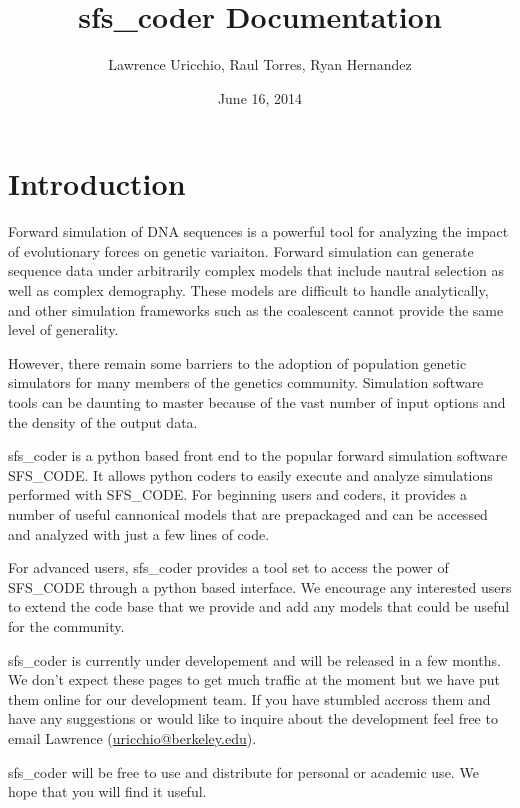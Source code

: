 \documentclass[letterpaper,10pt,english]{sphinxmanual}
\title{sfs\_coder Documentation}
\date{June 16, 2014}
\author{Lawrence Uricchio, Raul Torres, Ryan Hernandez}
\begin{document}
\maketitle
\tableofcontents
{}\label{index::doc}



\chapter{Introduction}
\label{rstfiles/intro:introduction}\label{rstfiles/intro::doc}\label{rstfiles/intro:sfs-coder-documentation}
Forward simulation of DNA sequences is a powerful tool for analyzing the impact
of evolutionary forces on genetic variaiton.  Forward simulation can generate
sequence data under arbitrarily complex models that include nautral selection
as well as complex demography.  These models are difficult to handle
analytically, and other simulation frameworks such as the coalescent cannot
provide the same level of generality.

However, there remain some barriers to the adoption of population genetic
simulators for many members of the genetics community. Simulation software
tools can be daunting to master because of the vast number of input options
and the density of the output data.

sfs\_coder is a python based front end to the popular forward simulation
software SFS\_CODE.  It allows python coders to easily execute and analyze
simulations performed with SFS\_CODE.  For beginning users and coders, it
provides a number of useful cannonical models that are prepackaged and can be
accessed and analyzed with just a few lines of code.

For advanced users, sfs\_coder provides a tool set to access the power of
SFS\_CODE through a python based interface.  We encourage any interested users
to extend the code base that we provide and add any models that could be
useful for the community.

sfs\_coder is currently under developement and will be released in a few
months.  We don't expect these pages to get much traffic at the moment
but we have put them online for our development team. If you have stumbled
accross them and have any suggestions or would like to inquire about the
development feel free to email Lawrence (\href{mailto:uricchio@berkeley.edu}{uricchio@berkeley.edu}).

sfs\_coder will be free to use and distribute for personal or academic use.
We hope that you will find it useful.
\end{document}
